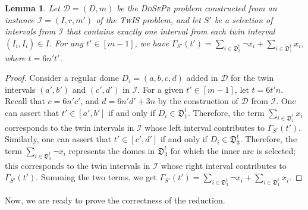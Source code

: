 \documentclass[letterpaper,11pt]{article}
\newtheorem{lemma}[theorem]{Lemma}
\newcommand{\tis}{\textsc{TwIS}\xspace}
\newcommand{\dspr}{\textsc{DoSePr}\xspace}
\begin{document}
\begin{lemma}\label{lem:gamUpBound}
Let $\mathcal{D}=(D,m)$ be the \dspr problem constructed from an instance $\mathcal{I}=(I,r,m')$ of the \tis problem, and let $S'$ be a selection of intervals from $\mathcal{I}$ that contains exactly one interval from each twin interval $(I_i,\overline{I_i}) \in I$. 
For any $t'\in[m-1]$, we have 
$\Gamma_{S'}(t') = \sum_{i \in \mathfrak{D}_3^t} \neg{x_i} +  \sum_{i \in \mathfrak{D}_1^t} x_i  $, where $t=6n't'$.
\end{lemma}

\begin{proof}
    Consider a regular dome $D_i = (a, b, c, d)$ added in $\mathcal{D}$ for the twin intervals $(a', b')$ and $(c', d')$ in $\mathcal{I}$.
For a given $t' \in [m-1]$, let $t = 6t'n$. Recall that  $c = 6n'c'$, and $d = 6n'd' + 3n$ by the construction of $\mathcal{D}$ from $\mathcal{I}$. One can assert that $t'\in [a', b']$ if and only if $D_i \in \mathfrak{D}^t_1$. Therefore, the term $\sum_{i \in \mathfrak{D}_1^t} x_i$ 
  corresponds to the twin intervals in $\mathcal{I}$ whose left interval 
contributes to $\Gamma_{S'}(t')$. 
Similarly, one can assert that $t' \in [c', d']$ if and only if $D_i \in \mathfrak{D}_3^t$. Therefore, the term $\sum_{i \in \mathfrak{D}_3^t} \neg{x_i}$ represents the domes in $\mathfrak{D}_3^t$ for which the inner arc is selected; this corresponds to the twin intervals in $\mathcal{I}$ whose right interval 
contributes to $\Gamma_{S'}(t')$. 
Summing the two terms, we get 
  $\Gamma_{S'}(t') = \sum_{i \in \mathfrak{D}_3^t} \neg{x_i} +  \sum_{i \in \mathfrak{D}_1^t} x_i $.
\end{proof}

Now, we are ready to prove the correctness of the reduction. 
\end{document}

